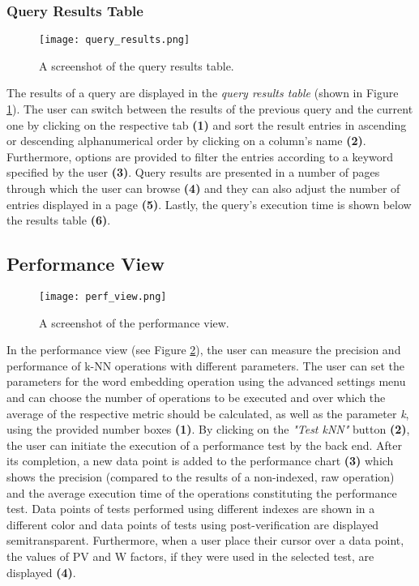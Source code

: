 \subsubsection{Query Results Table}
\begin{figure}
	\centering\texttt{[image: query\_results.png]}
	\caption{A screenshot of the query results table.}
	\label{fig:query_results}
\end{figure}
The results of a query are displayed in the \textit{query results table} (shown in Figure \ref{fig:query_results}). The user can switch between the results of the previous query and the current one by clicking on the respective tab \textbf{(1)} and sort the result entries in ascending or descending alphanumerical order by clicking on a column's name \textbf{(2)}. Furthermore, options are provided to filter the entries according to a keyword specified by the user \textbf{(3)}. Query results are presented in a number of pages through which the user can browse \textbf{(4)} and they can also adjust the number of entries displayed in a page \textbf{(5)}. Lastly, the query's execution time is shown below the results table \textbf{(6)}. 

\subsection{Performance View}
\begin{figure}
	\centering\texttt{[image: perf\_view.png]}
	\caption{A screenshot of the performance view.}
	\label{fig:perf_view}
\end{figure}
In the performance view (see Figure \ref{fig:perf_view}), the user can measure the precision and performance of k-NN operations with different parameters. The user can set the parameters for the word embedding operation using the advanced settings menu and can choose the number of operations to be executed and over which the average of the respective metric should be calculated, as well as the parameter \textit{k}, using the provided number boxes \textbf{(1)}. By clicking on the \textit{"Test kNN"} button \textbf{(2)}, the user can initiate the execution of a performance test by the back end. After its completion, a new data point is added to the performance chart \textbf{(3)} which shows the precision (compared to the results of a non-indexed, raw operation) and the average execution time of the operations constituting the performance test. Data points of tests performed using different indexes are shown in a different color and data points of tests using post-verification are displayed semitransparent. Furthermore, when a user place their cursor over a data point, the values of PV and W factors, if they were used in the selected test, are displayed \textbf{(4)}.

